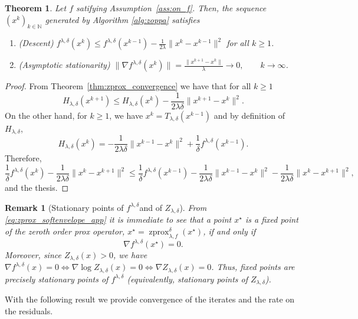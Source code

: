 \documentclass{article}
\newtheorem{theorem}{Theorem}
\newtheorem{remark}{Remark}
\newcommand{\zprox}{\ensuremath{\operatorname{zprox}}}
\begin{document}
\begin{theorem}\label{thm:descent_on_f}
Let $f$ satifying Assumption~\ref{ass:on_f}. Then, the sequence $(x^k)_{k\in\mathbb{N}}$ generated by
Algorithm \ref{alg:zoppa} satisfies
\begin{enumerate}
\item[(i)] (\emph{Descent}) $f^{\lambda,\delta}(x^{k})\le f^{\lambda,\delta}(x^{k-1}) - \frac{1}{2\lambda}\|x^{k}-x^{k-1}\|^2$ for all $k\ge 1$.
\item[(ii)] (\emph{Asymptotic stationarity}) $\|\nabla f^{\lambda, \delta}(x^k)\|=\frac{\|x^{k+1}-x^k\|}{\lambda}\to 0 , \qquad k\to\infty$.
\end{enumerate}
\end{theorem}
\begin{proof}
    From Theorem~\ref{thm:zprox_convergence} we have that for all $k\geq 1$
    \[H_{\lambda,\delta}(x^{k+1}) \leq H_{\lambda,\delta}(x^k) - \frac{1}{2\lambda\delta}\|x^{k+1}-x^k\|^2.\]
    On the other hand, for $k\geq 1$, we have $x^k= T_{\lambda,\delta}(x^{k-1})$ and by definition of $H_{\lambda,\delta}$,
    \[H_{\lambda,\delta}(x^{k})=-\frac{1}{2\lambda \delta} \|x^{k-1}-x^k\|^2 + \frac{1}{\delta}f^{\lambda, \delta}(x^{k-1}).\]
    Therefore, 
    \[\frac{1}{\delta}f^{\lambda,\delta}(x^{k}) -\frac{1}{2\lambda \delta}\|x^k-x^{k+1}\|^2 \leq \frac{1}{\delta} f^{\lambda,\delta}(x^{k-1}) -\frac{1}{2\lambda \delta}\|x^{k-1}-x^{k}\|^2-\frac{1}{2\lambda \delta}\|x^k-x^{k+1}\|^2,\]
    and the thesis.
\end{proof}

\begin{remark}[Stationary points of $f^{\lambda,\delta}$and of $Z_{\lambda,\delta}$]
From \eqref{eq:zprox_softenvelope_app} it is immediate to see that a point $x^\star$ is a fixed point of the zeroth order prox operator,
$x^\star=\zprox_{\lambda, f}^{\delta}(x^\star)$, if and only if
\begin{equation}
\nabla f^{\lambda,\delta}(x^\star)=0.
\label{eq:fixed_point_stationary}
\end{equation}
Moreover, since $Z_{\lambda,\delta}(x)>0$, we have $\nabla f^{\lambda,\delta}(x)=0 \iff \nabla \log Z_{\lambda,\delta}(x)=0 \iff \nabla Z_{\lambda, \delta}(x)=0$.
Thus, fixed points are precisely stationary points of $f^{\lambda,\delta}$ (equivalently, stationary
points of $Z_{\lambda,\delta}$).
\end{remark}

With the following result we provide convergence of the iterates and the rate on the residuals.
\end{document}
